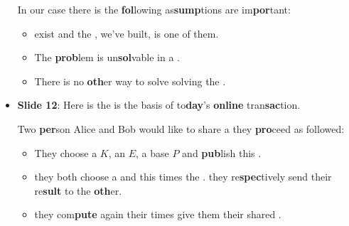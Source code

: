 \begin{itemize}
            In our case there is the \textbf{fol}lowing as\textbf{sump}tions  are
            im\textbf{por}tant:
            \begin{itemize}
                \item {} exist and the
                    , we've built, is one of them.
                \item The 
                    \textbf{prob}lem is un\textbf{sol}vable in a
                    .
                \item There is no \textbf{oth}er way to solve   solving
                    the .
            \end{itemize}
        \item \textbf{Slide 12}: Here is the   is the
            basis of to\textbf{day}'s \textbf{online} tran\textbf{sac}tion.

            Two \textbf{per}son Alice and Bob would like to share a   they
            \textbf{pro}ceed as followed:
            \begin{itemize}
                \item They choose a  $K$, an
                     $E$, a base
                     $P$ and \textbf{pub}lish this .
                \item {} they both choose a  and
                     this  times
                    the .  they re\textbf{spec}tively send their
                    re\textbf{sult} to the \textbf{oth}er.
                \item {} they com\textbf{pute} again their  times    give them their shared .
            \end{itemize}


\end{itemize}
